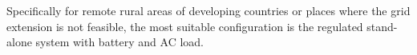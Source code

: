 \documentclass[review]{elsarticle}
\begin{document}
Specifically for remote rural areas of developing countries or places where the grid extension is not feasible, 
the most suitable configuration is the regulated stand-alone system with battery and AC load. %

 
\end{document}
